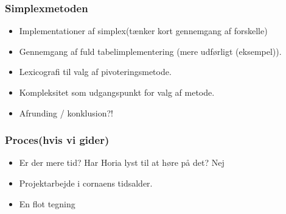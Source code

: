 \documentclass{beamer}
\begin{document}
%
%
\begin{frame}
\frametitle{Simplexmetoden}
\begin{itemize}
\item Implementationer af simplex(tænker kort gennemgang af forskelle)
\item Gennemgang af fuld tabelimplementering (mere udførligt (eksempel)).
\item Lexicografi til valg af pivoteringsmetode.
\item Kompleksitet som udgangspunkt for valg af metode.
\item Afrunding / konklusion?!
\end{itemize}
\end{frame}
%

\begin{frame}
\frametitle{Proces(hvis vi gider)}
\begin{itemize}
\item Er der mere tid? Har Horia lyst til at høre på det? Nej
\item Projektarbejde i cornaens tidsalder.
\item En flot tegning
\end{itemize}
\end{frame}
\end{document}
